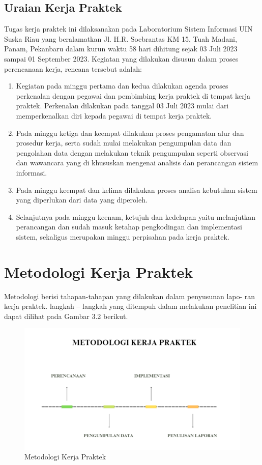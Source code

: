 \subsection{Uraian Kerja Praktek}
Tugas kerja praktek ini dilaksanakan pada Laboratorium Sistem Informasi
UIN Suska Riau yang beralamatkan Jl. H.R. Soebrantas KM 15, Tuah Madani, Panam, Pekanbaru dalam kurun waktu 58 hari dihitung sejak 03 Juli 2023 sampai 01 September 2023. Kegiatan yang dilakukan disusun dalam proses perencanaan kerja, rencana tersebut adalah:
\begin{enumerate}
  \item Kegiatan pada minggu pertama dan kedua dilakukan agenda proses perkenalan dengan pegawai dan pembimbing kerja praktek di tempat kerja praktek. Perkenalan dilakukan pada tanggal 03 Juli 2023 mulai dari memperkenalkan diri kepada pegawai di tempat kerja praktek.
  \item Pada minggu ketiga dan keempat dilakukan proses pengamatan alur dan prosedur kerja, serta sudah mulai melakukan pengumpulan data dan pengolahan data dengan melakukan teknik pengumpulan seperti observasi dan wawancara yang di khususkan mengenai analisis dan perancangan sistem informasi.
  \item Pada minggu keempat dan kelima dilakukan proses analisa kebutuhan sistem yang diperlukan dari data yang diperoleh.
  \item Selanjutnya pada minggu keenam, ketujuh dan kedelapan yaitu melanjutkan perancangan dan sudah masuk ketahap pengkodingan dan implementasi sistem, sekaligus merupakan minggu perpisahan pada kerja praktek.
\end{enumerate}
\section{Metodologi Kerja Praktek}
Metodologi berisi tahapan-tahapan yang dilakukan dalam penyusunan lapo-
ran kerja praktek. langkah – langkah yang ditempuh dalam melakukan penelitian ini
dapat dilihat pada Gambar 3.2 berikut.
\begin{figure}
  \centering
  \includegraphics[width=0.82\linewidth]{konten//gambar/metodologi kerja praktek.png}
  \caption{Metodologi Kerja Praktek}
  \label{fig:enter-label}
\end{figure}
